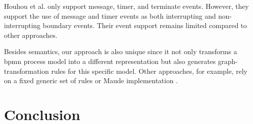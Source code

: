 \documentclass[adraft, copyright, creativecommons]{eptcs} %
\begin{document}
Houhou et al. only support message, timer, and terminate events.
However, they support the use of message and timer events as both interrupting and non-interrupting boundary events.
Their event support remains limited compared to other approaches.




Besides semantics, our approach is also unique since it not only transforms a \gls*{bpmn} process model into a different representation but also generates graph-transformation rules for this specific model.
Other approaches, for example, rely on a fixed generic set of rules \cite{vangorpVisualTokenbasedFormalization2013} or Maude implementation \cite{corradiniFormalApproachAnalysis2021}.
\section{Conclusion} \label{sec:conclusion}


\end{document}
